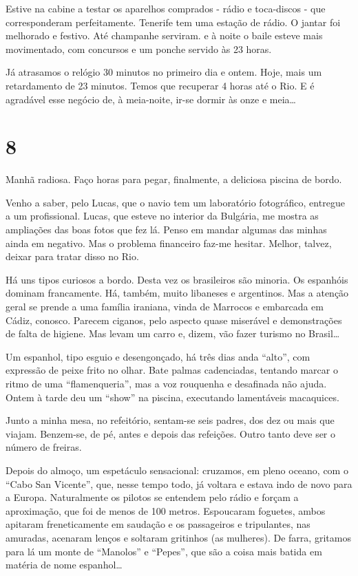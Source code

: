 Estive na cabine a testar os aparelhos comprados - rádio e toca-discos - que corresponderam perfeitamente. Tenerife tem uma estação de rádio. O jantar foi melhorado e festivo. Até champanhe serviram. e à noite o baile esteve mais movimentado, com concursos e um ponche servido às 23 horas.

Já atrasamos o relógio 30 minutos no primeiro dia e ontem. Hoje, mais um retardamento de 23 minutos. Temos que recuperar 4 horas até o Rio. E é agradável esse negócio de, à meia-noite, ir-se dormir às onze e meia\ldots

\section*{8 \adfflatleafright {}}
Manhã radiosa. Faço horas para pegar, finalmente, a deliciosa piscina de bordo.

Venho a saber, pelo Lucas, que o navio tem um laboratório fotográfico, entregue a um profissional. Lucas, que esteve no interior da Bulgária, me mostra as ampliações das boas fotos que fez lá. Penso em mandar algumas das minhas ainda em negativo. Mas o problema financeiro faz-me hesitar. Melhor, talvez, deixar para tratar disso no Rio.

Há uns tipos curiosos a bordo. Desta vez os brasileiros são minoria. Os espanhóis dominam francamente. Há, também, muito libaneses e argentinos. Mas a atenção geral se prende a uma família iraniana, vinda de Marrocos e embarcada em Cádiz, conosco. Parecem ciganos, pelo aspecto quase miserável e demonstrações de falta de higiene. Mas levam um carro e, dizem, vão fazer turismo no Brasil\ldots

Um espanhol, tipo esguio e desengonçado, há três dias anda ``alto'', com expressão de peixe frito no olhar. Bate palmas cadenciadas, tentando marcar o ritmo de uma ``flamenqueria'', mas a voz rouquenha e desafinada não ajuda. Ontem à tarde deu um ``show'' na piscina, executando lamentáveis macaquices.

Junto a minha mesa, no refeitório, sentam-se seis padres, dos dez ou mais que viajam. Benzem-se, de pé, antes e depois das refeições. Outro tanto deve ser o número de freiras.

Depois do almoço, um espetáculo sensacional: cruzamos, em pleno oceano, com o ``Cabo San Vicente'', que, nesse tempo todo, já voltara e estava indo de novo para a Europa. Naturalmente os pilotos se entendem pelo rádio e forçam a aproximação, que foi de menos de 100 metros. Espoucaram foguetes, ambos apitaram freneticamente em saudação e os passageiros e tripulantes, nas amuradas, acenaram lenços e soltaram gritinhos (as mulheres). De farra, gritamos para lá um monte de ``Manolos'' e ``Pepes'', que são a coisa mais batida em matéria de nome espanhol\ldots

